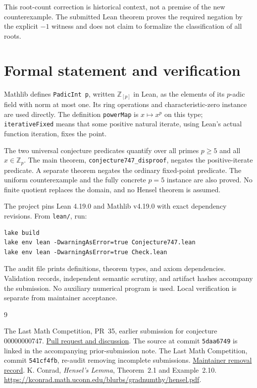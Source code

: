 \documentclass[11pt]{article}
\begin{document}
This root-count correction is historical context, not a premise of the new counterexample. The submitted Lean theorem proves the required negation by the explicit $-1$ witness and does not claim to formalize the classification of all roots.

\section{Formal statement and verification}
Mathlib defines \texttt{PadicInt p}, written $\mathbb Z_{[p]}$ in Lean, as the elements of its $p$-adic field with norm at most one. Its ring operations and characteristic-zero instance are used directly. The definition \texttt{powerMap} is $x\mapsto x^p$ on this type; \texttt{iterativeFixed} means that some positive natural iterate, using Lean's actual function iteration, fixes the point.

The two universal conjecture predicates quantify over all primes $p\geq5$ and all $x\in\mathbb Z_p$. The main theorem, \texttt{conjecture747\_disproof}, negates the positive-iterate predicate. A separate theorem negates the ordinary fixed-point predicate. The uniform counterexample and the fully concrete $p=5$ instance are also proved. No finite quotient replaces the domain, and no Hensel theorem is assumed.

The project pins Lean 4.19.0 and Mathlib v4.19.0 with exact dependency revisions. From \texttt{lean/}, run:
\begin{verbatim}
lake build
lake env lean -DwarningAsError=true Conjecture747.lean
lake env lean -DwarningAsError=true Check.lean
\end{verbatim}
The audit file prints definitions, theorem types, and axiom dependencies. Validation records, independent semantic scrutiny, and artifact hashes accompany the submission. No auxiliary numerical program is used. Local verification is separate from maintainer acceptance.

\begin{thebibliography}{9}
\raggedright
{} The Last Math Competition, PR~35, earlier submission for conjecture 00000000747. \href{https://github.com/The-Last-Math-Competition/The-Last-Math-Competition/pull/35}{Pull request and discussion}. The source at commit \texttt{5daa6749} is linked in the accompanying prior-submission note.
 The Last Math Competition, commit \texttt{541cf4fb}, re-audit removing incomplete submissions. \href{https://github.com/The-Last-Math-Competition/The-Last-Math-Competition/commit/541cf4fbc7aef3e17085577f6403c11c09f31fe1}{Maintainer removal record}.
 K. Conrad, \emph{Hensel's Lemma}, Theorem~2.1 and Example~2.10. \url{https://kconrad.math.uconn.edu/blurbs/gradnumthy/hensel.pdf}.
\end{thebibliography}
\end{document}
